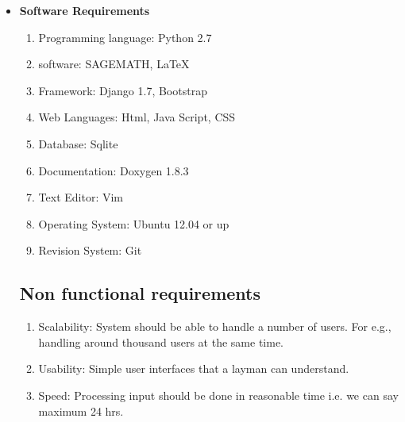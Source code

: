 \begin{itemize}
	\vskip 0.5cm
	\item {\bf Software Requirements}
	\begin{enumerate} 
		\item Programming language: Python 2.7
		\item software: SAGEMATH, \LaTeX{}
		\item Framework: Django 1.7, Bootstrap
		\item Web Languages: Html, Java Script, CSS
		\item Database: Sqlite 
		\item Documentation: Doxygen 1.8.3
		\item Text Editor: Vim
		\item Operating System: Ubuntu 12.04 or up
		\item Revision System: Git
		
	\end{enumerate}
	\vskip 0.5cm
	\subsection{Non functional requirements}
	\begin{enumerate} 
		\item Scalability: System should be able to handle a number of users. 
		For e.g., handling around thousand users at the same time.
		\item Usability: Simple user interfaces that a layman can understand.
		\item Speed: Processing input should be done in reasonable time
		i.e. we can say maximum 24 hrs.
	\end{enumerate}
\end{itemize}
